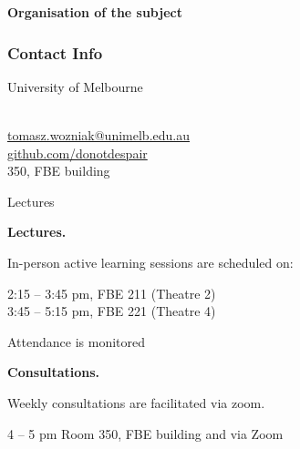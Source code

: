 \documentclass[notes,blackandwhite,mathsans]{beamer}
\begin{document}
{
\begin{frame}

\begin{adjustwidth}{-0.5cm}{0cm}
\vspace{8.3cm}\Large
\textbf{{\color{mcxs2}Organisation} {\color{mcxs1}of the subject}}
\end{adjustwidth}

\end{frame}
}




\begin{frame}
\frametitle{Contact Info}

\hspace{0.3cm}University of Melbourne \\
 \\


\vspace{0.5cm}
 \href{mailto:tomasz.wozniak@unimelb.edu.au}{tomasz.wozniak@unimelb.edu.au}\\
 {\color{mcxs2}\href{https://github.com/donotdespair}{github.com/donotdespair}}\\

\vspace{0.5cm}
 350{\color{mcxs3}, FBE building}

\end{frame}



\begin{frame}{Lectures}

\textbf{Lectures.}

\smallskip In-person active learning sessions are scheduled on:

\smallskip
{} 2:15 – 3:45 pm, FBE 211 (Theatre 2) \\
  3:45 – 5:15 pm, FBE 221 (Theatre 4)

\smallskip Attendance is monitored

\bigskip\textbf{Consultations.}

\smallskip Weekly consultations are facilitated via zoom.

\smallskip
{} 4 -- 5 pm {\color{mcxs2}Room 350, FBE building and via Zoom}


\end{frame}
\end{document}
